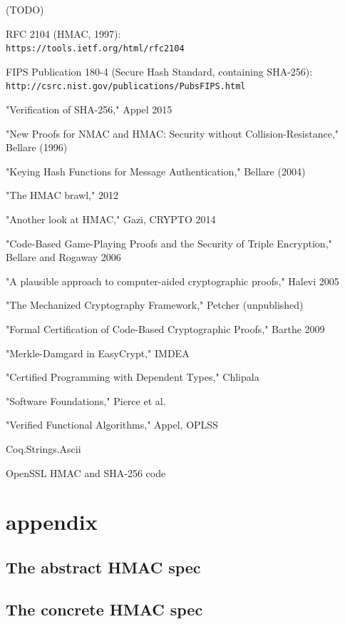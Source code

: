 \documentclass[twocolumn,showpacs,%
  nofootinbib,aps,superscriptaddress,%
  eqsecnum,prd,notitlepage,showkeys,10pt]{revtex4-1}
\begin{document}
(TODO)

RFC 2104 (HMAC, 1997): \\
\verb|https://tools.ietf.org/html/rfc2104|

FIPS Publication 180-4 (Secure Hash Standard, containing SHA-256): \\
\verb|http://csrc.nist.gov/publications/PubsFIPS.html|

"Verification of SHA-256," Appel 2015

"New Proofs for NMAC and HMAC: Security without Collision-Resistance," Bellare (1996)

"Keying Hash Functions for Message Authentication," Bellare (2004)

"The HMAC brawl," 2012

"Another look at HMAC," Gazi, CRYPTO 2014

"Code-Based Game-Playing Proofs and the Security of Triple Encryption," Bellare and Rogaway 2006

"A plausible approach to computer-aided cryptographic proofs," Halevi 2005

"The Mechanized Cryptography Framework," Petcher (unpublished)

"Formal Certification of Code-Based Cryptographic Proofs," Barthe 2009

"Merkle-Damgard in EasyCrypt," IMDEA

"Certified Programming with Dependent Types," Chlipala

"Software Foundations," Pierce et al.

"Verified Functional Algorithms," Appel, OPLSS

Coq.Strings.Ascii

OpenSSL HMAC and SHA-256 code


\section{appendix}

\subsection{The abstract HMAC spec}



\subsection{The concrete HMAC spec}
\end{document}

